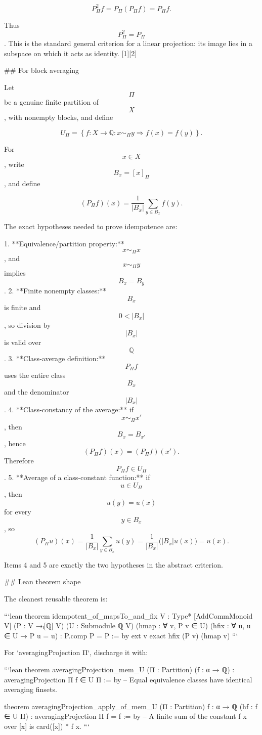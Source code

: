 $$
P_\Pi^2f=P_\Pi(P_\Pi f)=P_\Pi f.
$$

Thus $$P_\Pi^2=P_\Pi$$. This is the standard general criterion for a linear projection: its image lies in a subspace on which it acts as identity. [1][2]

## For block averaging

Let $$\Pi$$ be a genuine finite partition of $$X$$, with nonempty blocks, and define

$$
U_\Pi=
\left\{
f:X\to\mathbb Q:
x\sim_\Pi y\Rightarrow f(x)=f(y)
\right\}.
$$

For $$x\in X$$, write $$B_x=[x]_\Pi$$, and define

$$
(P_\Pi f)(x)
=
\frac{1}{|B_x|}
\sum_{y\in B_x}f(y).
$$

The exact hypotheses needed to prove idempotence are:

1. **Equivalence/partition property:** $$x\sim_\Pi x$$, and $$x\sim_\Pi y$$ implies $$B_x=B_y$$.
2. **Finite nonempty classes:** $$B_x$$ is finite and $$0<|B_x|$$, so division by $$|B_x|$$ is valid over $$\mathbb Q$$.
3. **Class-average definition:** $$P_\Pi f$$ uses the entire class $$B_x$$ and the denominator $$|B_x|$$.
4. **Class-constancy of the average:** if $$x\sim_\Pi x'$$, then $$B_x=B_{x'}$$, hence
   $$
   (P_\Pi f)(x)=(P_\Pi f)(x').
   $$
   Therefore $$P_\Pi f\in U_\Pi$$.
5. **Average of a class-constant function:** if $$u\in U_\Pi$$, then $$u(y)=u(x)$$ for every $$y\in B_x$$, so
   $$
   (P_\Pi u)(x)
   =
   \frac{1}{|B_x|}
   \sum_{y\in B_x}u(y)
   =
   \frac{1}{|B_x|}\bigl(|B_x|u(x)\bigr)
   =
   u(x).
   $$

Items 4 and 5 are exactly the two hypotheses in the abstract criterion.

## Lean theorem shape

The cleanest reusable theorem is:

```lean
theorem idempotent_of_mapsTo_and_fix
    {V : Type*} [AddCommMonoid V]
    (P : V →ₗ[ℚ] V) (U : Submodule ℚ V)
    (hmap : ∀ v, P v ∈ U)
    (hfix : ∀ u, u ∈ U → P u = u) :
    P.comp P = P := by
  ext v
  exact hfix (P v) (hmap v)
```

For `averagingProjection Π`, discharge it with:

```lean
theorem averagingProjection_mem_U (Π : Partition) (f : α → ℚ) :
    averagingProjection Π f ∈ U Π := by
  -- Equal equivalence classes have identical averaging finsets.

theorem averagingProjection_apply_of_mem_U
    (Π : Partition) {f : α → ℚ} (hf : f ∈ U Π) :
    averagingProjection Π f = f := by
  -- A finite sum of the constant f x over [x] is card([x]) * f x.
```


